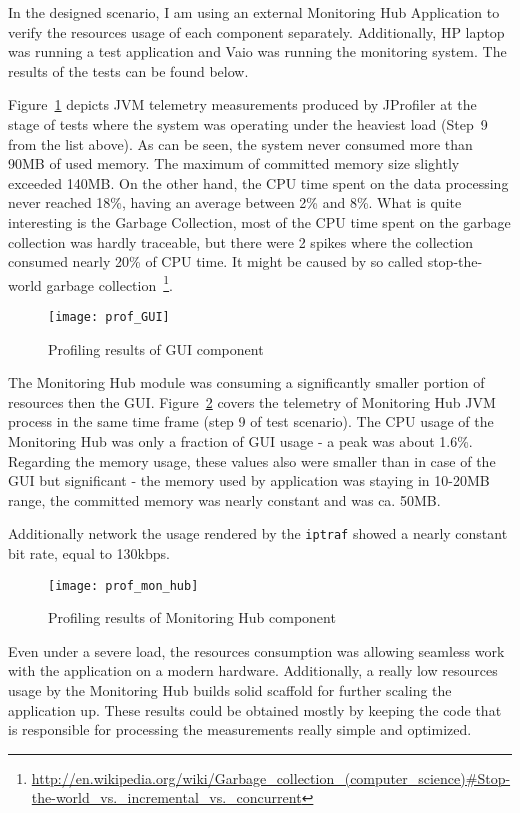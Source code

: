 In the designed scenario, I am using an external Monitoring Hub Application to verify the resources usage of each component separately. Additionally, HP laptop was running a test application and Vaio was running the monitoring system. The results of the tests can be found below.

Figure~\ref{fig:prof_GUI} depicts JVM telemetry measurements produced by JProfiler at the stage of tests where the system was operating under the heaviest load (Step~9 from the list above). As can be seen, the system never consumed more than 90MB of used memory. The maximum of committed memory size slightly exceeded 140MB. On the other hand, the CPU time spent on the data processing never reached 18\%, having an average between 2\% and 8\%. What is quite interesting is the Garbage Collection, most of the CPU time spent on the garbage collection was hardly traceable, but there were 2 spikes where the collection consumed nearly 20\% of CPU time. It might be caused by so called stop-the-world garbage collection~\footnote{\url{http://en.wikipedia.org/wiki/Garbage_collection_(computer_science)#Stop-the-world_vs._incremental_vs._concurrent}}.

\begin{figure}[ht]
\centering
\texttt{[image: prof\_GUI]}
\caption{Profiling results of GUI component}
\label{fig:prof_GUI}
\end{figure}

The Monitoring Hub module was consuming a significantly smaller portion of resources then the GUI. Figure~\ref{fig:prof_mon_hub} covers the telemetry of Monitoring Hub JVM process in the same time frame (step 9 of test scenario). The CPU usage of the Monitoring Hub was only a fraction of GUI usage - a peak was about 1.6\%. Regarding the memory usage, these values also were smaller than in case of the GUI but significant - the memory used by application was staying in 10-20MB range, the committed memory was nearly constant and was ca. 50MB.

Additionally network the usage rendered by the \texttt{iptraf} showed a nearly constant bit rate, equal to 130kbps.

\begin{figure}[ht]
\centering
\texttt{[image: prof\_mon\_hub]}
\caption{Profiling results of Monitoring Hub component}
\label{fig:prof_mon_hub}
\end{figure}

Even under a severe load, the resources consumption was allowing seamless work with the application on a modern hardware. Additionally, a really low resources usage by the Monitoring Hub builds solid scaffold for further scaling the application up. These results could be obtained mostly by keeping the code that is responsible for processing the measurements really simple and optimized.

